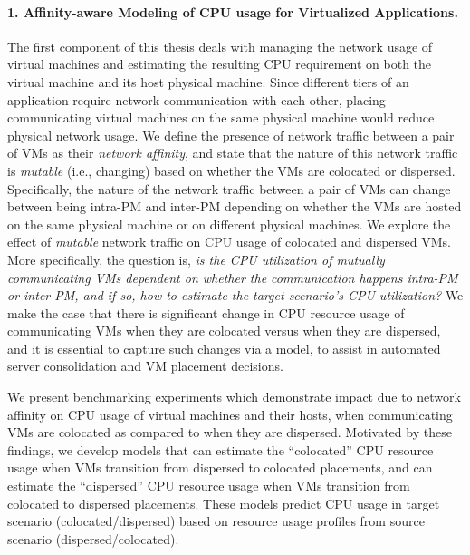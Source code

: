 \paragraph{1. Affinity-aware Modeling of CPU usage for Virtualized Applications.}
The first component of this thesis deals with managing the network 
usage of virtual machines and estimating the resulting CPU 
requirement on both the virtual machine 
and its host physical machine.
Since different tiers of an application require network
communication with each other, placing communicating virtual
machines on the same physical machine 
would reduce physical network 
usage. We define the presence of network traffic between a pair
of VMs as their \textit{network affinity}, 
and state that the
nature of this network traffic is \textit{mutable} 
(i.e., changing) based on
whether the VMs are colocated or 
dispersed. Specifically, the
nature of the network traffic between a pair of VMs
can change between being
intra-PM and inter-PM 
depending on whether the VMs are hosted
on the same physical machine or on different physical machines.
We explore the effect of \textit{mutable}
network traffic on CPU usage of colocated and dispersed VMs. More
specifically, the question is, \textit{is the CPU utilization of mutually
communicating VMs dependent on whether the communication happens
intra-PM or inter-PM, and if so, 
how to estimate the target scenario's CPU utilization?}
We make the case that there is significant change in CPU resource
usage of communicating VMs when they are colocated versus when they are 
dispersed, and it is
essential to capture such changes via a model, to assist in
automated server consolidation 
and VM placement decisions.

We present benchmarking experiments
which demonstrate impact due to network affinity
on CPU usage of virtual machines and their hosts, when communicating
VMs are colocated as compared to
when they are dispersed. Motivated by these findings, we develop models
that can estimate the ``colocated'' CPU resource usage when VMs transition
from dispersed to colocated placements, and can estimate the ``dispersed''
CPU resource usage when VMs transition from colocated to dispersed
placements. These models predict CPU usage in target 
scenario (colocated/dispersed) based on resource usage profiles 
from source scenario (dispersed/colocated).

